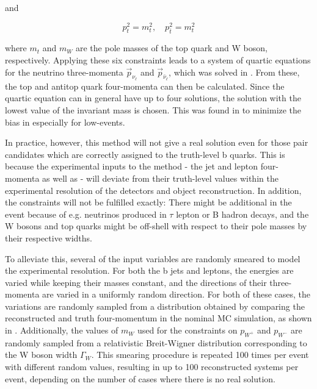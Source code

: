 and

\begin{equation}
    p_{t}^2 = m_t^2 , \quad p_{\bar{t}}^2 = m_t^2
\end{equation}

where $m_t$ and $m_W$ are the pole masses of the top quark and W boson, respectively. Applying these six constraints leads to a system of quartic equations for the neutrino three-momenta $\vec{p}_{\nu_{\ell}}$ and $\vec{p}_{\bar{\nu}_{\ell}}$, which was solved in . From these, the top and antitop quark four-momenta can then be calculated. Since the quartic equation can in general have up to four solutions, the solution with the lowest value of the invariant \ttbar mass \mtt is chosen. This was found in  to minimize the bias in \mtt especially for low-\mtt events.

In practice, however, this method will not give a real solution even for those \bbbar pair candidates which are correctly assigned to the truth-level b quarks. This is because the experimental inputs to the method - the jet and lepton four-momenta as well as \ptmissvec - will deviate from their truth-level values within the experimental resolution of the detectors and object reconstruction. In addition, the constraints will not be fulfilled exactly: There might be additional \ptmiss in the event because of e.g. neutrinos produced in $\tau$ lepton or B hadron decays, and the W bosons and top quarks might be off-shell with respect to their pole masses by their respective widths.

To alleviate this, several of the input variables are randomly smeared to model the experimental resolution. For both the b jets and leptons, the energies are varied while keeping their masses constant, and the directions of their three-momenta are varied in a uniformly random direction. For both of these cases, the variations are randomly sampled from a distribution obtained by comparing the reconstructed and truth four-momentum in the nominal \ttbar MC simulation, as shown in . Additionally, the values of $m_W$ used for the constraints on $p_{W^+}$ and $p_{W^-}$ are randomly sampled from a relativistic Breit-Wigner distribution corresponding to the W boson width $\Gamma_W$. This smearing procedure is repeated 100 times per event with different random values, resulting in up to 100 reconstructed \ttbar systems per event, depending on the number of cases where there is no real solution. %

